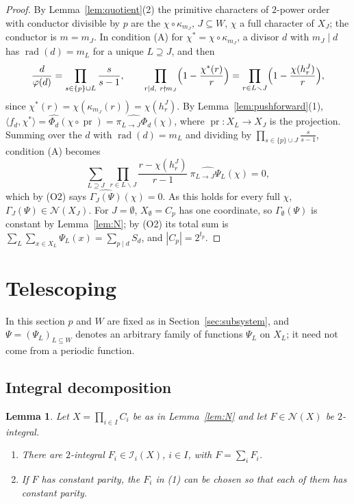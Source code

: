 \documentclass[11pt]{amsart}
\newtheorem{lemma}[theorem]{Lemma}
\theoremstyle{definition}
\theoremstyle{remark}
\newcommand{\Nn}{\mathcal N}
\newcommand{\ip}[2]{\langle #1,#2\rangle}
\DeclareMathOperator{\rad}{rad}
\DeclareMathOperator{\pr}{pr}
\numberwithin{equation}{section}
\begin{document}
\begin{proof}
By Lemma~\ref{lem:quotient}(2) the primitive characters of $2$-power order with conductor divisible by $p$ are the $\chi\circ\kappa_{m_J}$, $J\subseteq W$, $\chi$ a full character of $X_J$; the conductor is $m=m_J$.
In condition (A) for $\chi^*=\chi\circ\kappa_{m_J}$, a divisor $d$ with $m_J\mid d$ has $\rad(d)=m_L$ for a unique $L\supseteq J$, and then
\[
\frac d{\varphi(d)}=\prod_{s\in\{p\}\cup L}\frac s{s-1},\qquad
\prod_{r\mid d,\ r\nmid m_J}\Bigl(1-\frac{\chi^*(r)}r\Bigr)=\prod_{r\in L\smallsetminus J}\Bigl(1-\frac{\chi(h^J_r)}r\Bigr),
\]
since $\chi^*(r)=\chi(\kappa_{m_J}(r))=\chi(h^J_r)$.
By Lemma~\ref{lem:pushforward}(1), $\ip{f_d}{\chi^*}=\widehat{\Phi_d}(\chi\circ\pr)=\widehat{\pi_{L\to J}\Phi_d}(\chi)$, where $\pr\colon X_L\to X_J$ is the projection.
Summing over the $d$ with $\rad(d)=m_L$ and dividing by $\prod_{s\in\{p\}\cup J}\frac{s}{s-1}$, condition (A) becomes
\[
\sum_{L\supseteq J}\ \prod_{r\in L\smallsetminus J}\frac{r-\chi(h^J_r)}{r-1}\ \widehat{\pi_{L\to J}\Psi_L}(\chi)=0,
\]
which by (O2) says $\widehat{\Gamma_J(\Psi)}(\chi)=0$.
As this holds for every full $\chi$, $\Gamma_J(\Psi)\in\Nn(X_J)$.
For $J=\emptyset$, $X_\emptyset=C_p$ has one coordinate, so $\Gamma_\emptyset(\Psi)$ is constant by Lemma~\ref{lem:N}; by (O2) its total sum is $\sum_L\sum_{x\in X_L}\Psi_L(x)=\sum_{p\mid d}S_d$, and $|C_p|=2^{t_p}$.
\end{proof}
\section{Telescoping}\label{sec:telescope}

In this section $p$ and $W$ are fixed as in Section~\ref{sec:subsystem}, and $\Psi=(\Psi_L)_{L\subseteq W}$ denotes an arbitrary family of functions $\Psi_L$ on $X_L$; it need not come from a periodic function.

\subsection{Integral decomposition}

\begin{lemma}\label{lem:decomp}
Let $X=\prod_{i\in I}C_i$ be as in Lemma~\ref{lem:N} and let $F\in\Nn(X)$ be $2$-integral.
\begin{enumerate}
\item There are $2$-integral $F_i\in\mathcal I_i(X)$, $i\in I$, with $F=\sum_iF_i$.
\item If $F$ has constant parity, the $F_i$ in \textup{(1)} can be chosen so that each of them has constant parity.
\end{enumerate}
\end{lemma}
\end{document}
